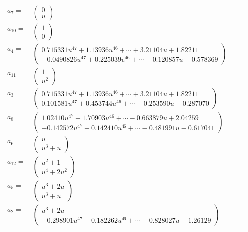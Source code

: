 \documentclass[1p]{elsarticle_modified}
\theoremstyle{definition}
\begin{document}
\begin{tabular}{m{7pt} m{180pt} m{7pt} m{180pt} }
\flushright $a_{7}=$&$\begin{pmatrix}0\\u\end{pmatrix}$ \\
\flushright $a_{10}=$&$\begin{pmatrix}1\\0\end{pmatrix}$ \\
\flushright $a_{4}=$&$\begin{pmatrix}0.715331 u^{47}+1.13936 u^{46}+\cdots+3.21104 u+1.82211\\-0.0490826 u^{47}+0.225039 u^{46}+\cdots-0.120857 u-0.578369\end{pmatrix}$ \\
\flushright $a_{11}=$&$\begin{pmatrix}1\\u^2\end{pmatrix}$ \\
\flushright $a_{3}=$&$\begin{pmatrix}0.715331 u^{47}+1.13936 u^{46}+\cdots+3.21104 u+1.82211\\0.101581 u^{47}+0.453744 u^{46}+\cdots-0.253590 u-0.287070\end{pmatrix}$ \\
\flushright $a_{8}=$&$\begin{pmatrix}1.02410 u^{47}+1.70903 u^{46}+\cdots-0.663879 u+2.04259\\-0.142572 u^{47}-0.142410 u^{46}+\cdots-0.481991 u-0.617041\end{pmatrix}$ \\
\flushright $a_{6}=$&$\begin{pmatrix}u\\u^3+u\end{pmatrix}$ \\
\flushright $a_{12}=$&$\begin{pmatrix}u^2+1\\u^4+2 u^2\end{pmatrix}$ \\
\flushright $a_{5}=$&$\begin{pmatrix}u^3+2 u\\u^3+u\end{pmatrix}$ \\
\flushright $a_{2}=$&$\begin{pmatrix}u^3+2 u\\-0.298901 u^{47}-0.182262 u^{46}+\cdots-0.828027 u-1.26129\end{pmatrix}$ \\

\end{tabular}
\end{document}
